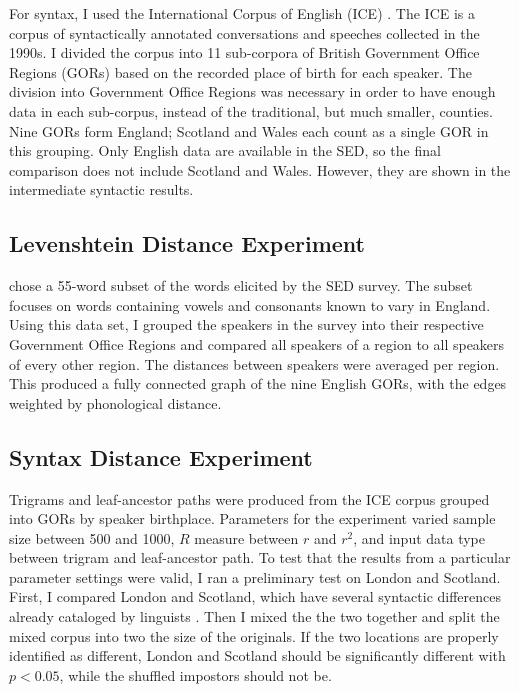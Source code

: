 \documentclass[11pt]{article}
\begin{document}
For syntax, I used the International Corpus of English (ICE)
\cite{nelson02}. The ICE is a corpus of syntactically annotated
conversations and speeches collected in the 1990s. I divided the
corpus into 11 sub-corpora of British Government Office Regions (GORs)
based on the recorded place of birth for each speaker. The division
into Government Office Regions was necessary in order to have enough
data in each sub-corpus, instead of the traditional, but much smaller,
counties. Nine GORs form England; Scotland and Wales each count as a
single GOR in this grouping. Only English data are available in the
SED, so the final comparison does not include Scotland and
Wales. However, they are shown in the intermediate syntactic results.

\subsection{Levenshtein Distance Experiment}

 chose a 55-word subset of the words elicited
by the SED survey. The subset focuses on words containing vowels and
consonants known to vary in England. Using this data set, I grouped
the speakers in the survey into their respective Government Office
Regions and compared all speakers of a region to all speakers of every
other region. The distances between speakers were averaged per region.
This produced a fully connected graph of the nine English GORs, with
the edges weighted by phonological distance.

\subsection{Syntax Distance Experiment}

Trigrams and leaf-ancestor paths were produced from the ICE corpus
grouped into GORs by speaker birthplace. Parameters for the experiment
varied sample size between 500 and 1000, $R$ measure between $r$ and
$r^2$, and input data type between trigram and leaf-ancestor path. To
test that the results from a particular parameter settings were valid,
I ran a preliminary test on London and Scotland. First, I
compared London and Scotland, which have several syntactic
differences already cataloged by linguists \cite{aitken79}.  Then I
mixed the the two together and split the mixed corpus into two the size of
the originals. If the two locations are properly identified as
different, London and Scotland should be significantly different with
$p < 0.05$, while the shuffled impostors should not be.
\end{document}
